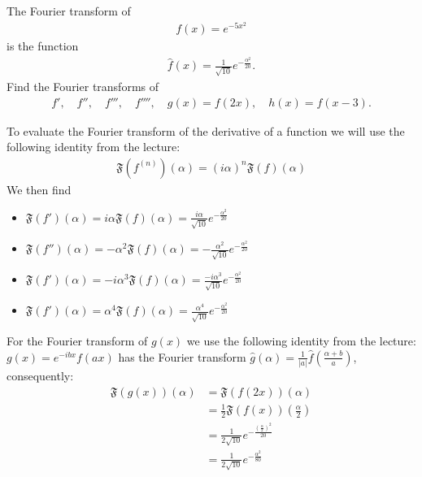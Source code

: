 \documentclass[11pt]{article}
\begin{document}
\begin{exercise}
    The Fourier transform of 
    \begin{align*}
        f(x) = e^{-5x^2}
    \end{align*}
    is the function 
    \begin{align*}
        \hat f(x) = \frac{1}{\sqrt{10}} e^{-\frac{\alpha^2}{20}}.
    \end{align*}
    Find the Fourier transforms of 
    \begin{align*}
     f', \quad f'', \quad f''', \quad f'''', \quad g(x) = f(2x), \quad h(x) = f(x-3).
    \end{align*}
\end{exercise}
\begin{solution}  
    To evaluate the Fourier transform of the derivative of a function we will use the following identity from the lecture:
    \begin{gather*}
        \mathfrak{F}\left(f^{(n)}\right)(\alpha)=(i \alpha)^n \mathfrak{F}(f)(\alpha)
    \end{gather*}
    We then find 
    \begin{itemize}
    \item $\mathfrak{F}\left(f' \right)(\alpha) = i \alpha \mathfrak{F}(f)(\alpha) = \frac{i \alpha}{\sqrt{10}} e^{-\frac{\alpha^2}{20}}$
    \item $\mathfrak{F}\left(f'' \right)(\alpha) = -\alpha^2 \mathfrak{F}(f)(\alpha) = -\frac{ \alpha^2}{\sqrt{10}} e^{-\frac{\alpha^2}{20}}$
    \item $\mathfrak{F}\left(f' \right)(\alpha) = -i \alpha^3 \mathfrak{F}(f)(\alpha) = \frac{-i \alpha^3}{\sqrt{10}} e^{-\frac{\alpha^2}{20}}$
    \item $\mathfrak{F}\left(f' \right)(\alpha) = \alpha^4 \mathfrak{F}(f)(\alpha) = \frac{ \alpha^4}{\sqrt{10}} e^{-\frac{\alpha^2}{20}}$
    \end{itemize}
    For the Fourier transform of $g(x)$ we use the following identity from the lecture: 
    $g(x)=e^{-i b x} f(a x)$ has the Fourier transform
    $\hat{g}(\alpha)=\frac{1}{|a|} \hat{f}\left(\frac{\alpha+b}{a}\right)$,
    consequently:
    \begin{align*}
        \mathfrak{F}(g(x))(\alpha) & =\mathfrak{F}(f(2 x))(\alpha) \\ & =\frac{1}{2} \mathfrak{F}(f(x))\left(\frac{\alpha}{2}\right) \\ & =\frac{1}{2 \sqrt{10}} e^{-\frac{\left(\frac{\alpha}{2}\right)^2}{20}} \\ & =\frac{1}{2 \sqrt{10}} e^{-\frac{\alpha^2}{80}}

\end{align*}
\end{solution}
\end{document}
